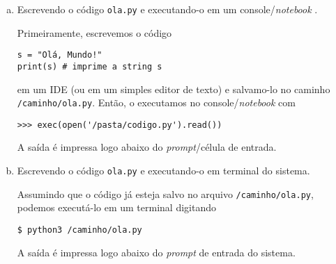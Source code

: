 \begin{ex}
\begin{enumerate}[a)]
  \item Escrevendo o código \verb+ola.py+ e executando-o em um console/\textit{notebook} {\python}.
  
  Primeiramente, escrevemos o código

\begin{lstlisting}
s = "Olá, Mundo!"
print(s) # imprime a string s
\end{lstlisting}

em um IDE (ou em um simples editor de texto) e salvamo-lo no caminho \texttt{/caminho/ola.py}. Então, o executamos no console/\textit{notebook} {\python} com

\begin{lstlisting}
>>> exec(open('/pasta/codigo.py').read())
\end{lstlisting}

A saída é impressa logo abaixo do \textit{prompt}/célula de entrada.
  
  \item Escrevendo o código \verb+ola.py+ e executando-o em terminal do sistema.
  
  Assumindo que o código já esteja salvo no arquivo \texttt{/caminho/ola.py}, podemos executá-lo em um terminal digitando

\begin{lstlisting}
$ python3 /caminho/ola.py
\end{lstlisting}

  A saída é impressa logo abaixo do \textit{prompt} de entrada do sistema.
\end{enumerate}

\end{ex}
